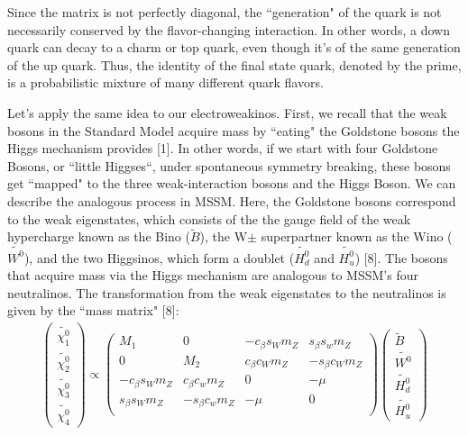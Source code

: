 \documentclass{article}
\begin{document}
\par
Since the matrix is not perfectly diagonal, the ``generation"  of the quark is not necessarily conserved by the flavor-changing interaction. In other words, a down quark can decay to a charm or top quark, even though it's of the same generation of the up quark. Thus, the identity of the final state quark, denoted by the prime, is a probabilistic mixture of many different quark flavors.
\par
Let's apply the same idea to our electroweakinos. First, we recall that the weak bosons in the Standard Model acquire mass by ``eating"  the Goldstone bosons the Higgs mechanism provides [1]. In other words, if we start with four Goldstone Bosons, or ``little Higgses``, under spontaneous symmetry breaking, these bosons get ``mapped"  to the three weak-interaction bosons and the Higgs Boson. We can describe the analogous process in MSSM. Here, the Goldstone bosons correspond to the weak eigenstates, which consists of the the gauge field of the weak hypercharge known as the Bino ($\tilde{B}$), the W$\pm$ superpartner known as the Wino ($\tilde{W^{0}}$), and the two Higgsinos, which form a doublet ($\tilde{H_{d}^{0}}$ and $\tilde{H_{u}^{0}}$) [8]. The bosons that acquire mass via the Higgs mechanism are analogous to MSSM's four neutralinos. The transformation from the weak eigenstates to the neutralinos is given by the ``mass matrix"  [8]:
\begin{gather} \label{eq:13}
\begin{pmatrix}
    \tilde{\chi^{0}_{1}} \\
    \tilde{\chi^{0}_{2}} \\
    \tilde{\chi^{0}_{3}} \\
    \tilde{\chi^{0}_{4}}
\end{pmatrix}
\propto
\begin{pmatrix}
    M_{1} & 0 & -c_{\beta}s_{W}m_{Z} & s_{\beta}s_{w}m_{Z} \\
    0 & M_{2} & c_{\beta}c_{W}m_{Z} & -s_{\beta}c_{W}m_{Z} \\
    -c_{\beta}s_{W}m_{Z} & c_{\beta}c_{w}m_{Z} & 0 & -\mu \\
    s_{\beta}s_{W}m_{Z} & -s_{\beta}c_{w}m_{Z} & -\mu & 0 \\
\end{pmatrix}
\begin{pmatrix}
    \tilde{B} \\
    \tilde{W^{0}} \\
    \tilde{H_{d}^{0}} \\
    \tilde{H_{u}^{0}}
\end{pmatrix}
\end{gather}
\end{document}
